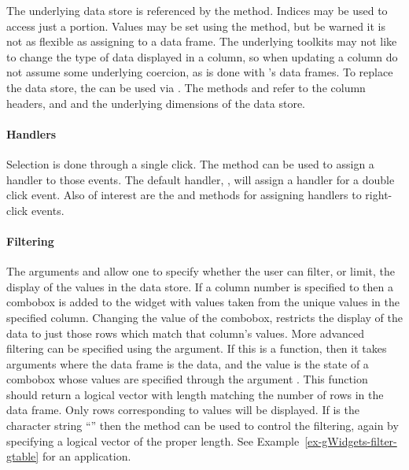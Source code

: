 The underlying data store is referenced by the \method{[}{gtable}
method. Indices may be used to access just a portion. Values may be
set using the \method{[\ASSIGN}{gtable} method, but be warned it is
not as flexible as assigning to a data frame. The underlying
toolkits may not like to change the type of data displayed in a
column, so when updating a column do not assume some underlying
coercion, as is done with \R's data frames. To replace the data store, the \code{[\ASSIGN} can
be used via . The methods
 and  refer to the
column headers, and  and 
the underlying dimensions of the data store.

\paragraph{Handlers}
Selection is done through a single click. The 
method can be used to assign a handler to those events. The default
handler, , will assign a
handler for a double click event. Also of interest are the
 and
 methods for assigning handlers
to  right-click events.

\paragraph{Filtering}
The arguments  and
 allow one to specify whether the user
can filter, or limit, the display of the values in the data store. If
a column number is specified to  then a combobox
is added to the widget with values taken from the unique values in the
specified column. Changing the value of the combobox, restricts the
display of the data to just those rows which match that column's
values. More advanced filtering can be specified using the
 argument. If this is a function, then it takes
arguments  where the data frame is the
data, and the  value is the state of a combobox whose
values are specified through the argument
. This function should return a logical
vector with length matching the number of rows in the data frame.
Only rows corresponding to  values will be displayed. If
 is the character string ``'' then the
 method can be used to control the
filtering, again by specifying a logical vector of the proper
length. See Example~\ref{ex-gWidgets-filter-gtable} for an
application.


